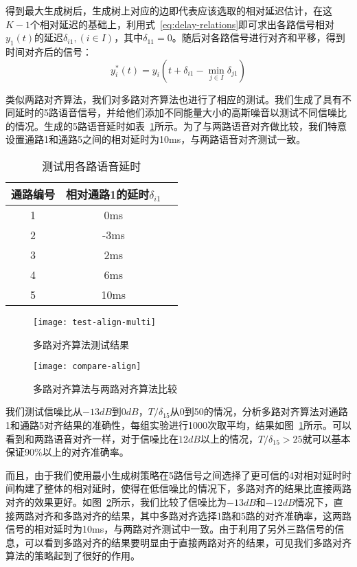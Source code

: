 得到最大生成树后，生成树上对应的边即代表应该选取的相对延迟估计，在这$K-1$个相对延迟的基础上，利用式~\ref{eq:delay-relations}即可求出各路信号相对$y_1 (t)$的延迟$\delta_{i1},(i \in I)$，其中$\delta_{11}=0$。随后对各路信号进行对齐和平移，得到时间对齐后的信号：
\begin{equation}
y_i^* (t)=y_i (t+\delta_{i1}-\min_{j\in I}\delta_{j1})
\end{equation}

类似两路对齐算法，我们对多路对齐算法也进行了相应的测试。我们生成了具有不同延时的5路语音信号，并给他们添加不同能量大小的高斯噪音以测试不同信噪比的情况。生成的5路语音延时如表~\ref{tab:delays}所示。为了与两路语音对齐做比较，我们特意设置通路1和通路5之间的相对延时为10ms，与两路语音对齐测试一致。

\begin{table}
\centering
\caption{测试用各路语音延时}
\label{tab:delays}
\begin{tabular}{ccc}
\toprule[1.5pt]
通路编号 & 相对通路1的延时$\delta_{i1}$ \\ \midrule[1pt]
1 & 0ms \\
2 & -3ms \\
3 & 2ms \\
4 & 6ms \\
5 & 10ms \\
\end{tabular}
\end{table}

\begin{figure}
\centering
\texttt{[image: test-align-multi]}
\caption{多路对齐算法测试结果\label{fig:test-align-multi}}
\end{figure}

\begin{figure}
\centering
\texttt{[image: compare-align]}
\caption{多路对齐算法与两路对齐算法比较\label{fig:compare-align}}
\end{figure}

我们测试信噪比从$-13dB$到$0dB$，$T/\delta_{15}$从0到50的情况，分析多路对齐算法对通路1和通路5对齐结果的准确性，每组实验进行1000次取平均，结果如图~\ref{fig:test-align-multi}所示。可以看到和两路语音对齐一样，对于信噪比在$12dB$以上的情况，$T/\delta_{15} > 25$就可以基本保证90\%以上的对齐准确率。

而且，由于我们使用最小生成树策略在5路信号之间选择了更可信的4对相对延时时间构建了整体的相对延时，使得在低信噪比的情况下，多路对齐的结果比直接两路对齐的效果更好。如图~\ref{fig:compare-align}所示，我们比较了信噪比为$-13dB$和$-12dB$情况下，直接两路对齐和多路对齐的结果，其中多路对齐选择1路和5路的对齐准确率，这两路信号的相对延时为10ms，与两路对齐测试中一致。由于利用了另外三路信号的信息，可以看到多路对齐的结果要明显由于直接两路对齐的结果，可见我们多路对齐算法的策略起到了很好的作用。

